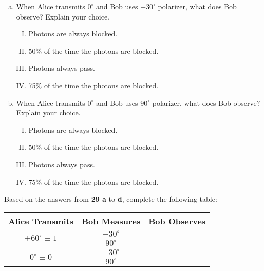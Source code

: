 \documentclass[12pt]{article}
\newcommand\half{\frac{1}{2}}
\newcommand\tbf[1]{\textbf{#1}}
\begin{document}
\begin{enumerate}[1.]
\begin{enumerate}[a)]
\item When Alice transmits $0^\circ$ and Bob uses $-30^\circ$ polarizer, what does Bob observe? Explain your choice.
\begin{enumerate}[I.]
\item Photons are always blocked.
\item 50\% of the time the photons are blocked.
\item Photons always pass.
\item 75\% of the time the photons are blocked.
\end{enumerate}
\item When Alice transmits $0^\circ$ and Bob uses $90^\circ$ polarizer, what does Bob observe? Explain your choice.
\begin{enumerate}[I.]
\item Photons are always blocked.
\item 50\% of the time the photons are blocked.
\item Photons always pass.
\item 75\% of the time the photons are blocked.
\end{enumerate}
\end{enumerate}
			
		
	
\end{enumerate}



Based on the answers from \tbf{29 a} to \tbf{d}, complete the following table:
\begin{center}
\begin{tabular}{|c|c|c|}
\hline
Alice Transmits & Bob Measures & Bob Observes \\
\hline
\multirow{2}{*}{$+60^\circ \equiv 1$} & $-30^\circ$ & \phantom{0} \\
					   \cline{2-3}
					   & $90^\circ$ & \phantom{$\half$} \\
\hline
\multirow{2}{*}{$0^\circ \equiv 0$} & $-30^\circ$ & \phantom{$\half$} \\
						\cline{2-3}
					& $90^\circ$ & \phantom{0} \\
\hline
\end{tabular}
\end{center}
\end{document}
